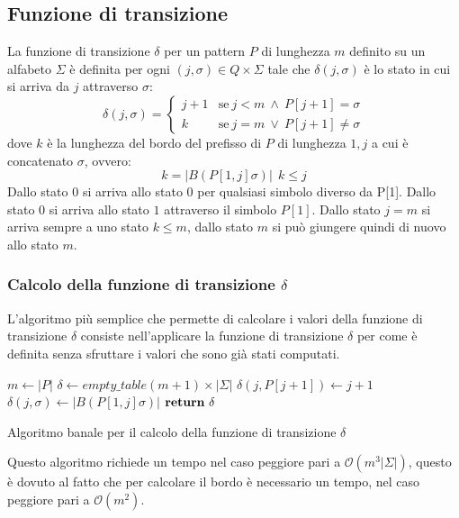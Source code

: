 \subsection{Funzione di transizione}
La funzione di transizione $\delta$ per un pattern $P$ di lunghezza $m$ definito
su un alfabeto $\Sigma$ è definita per ogni $(j, \sigma) \in Q \times \Sigma$ tale
che $\delta(j, \sigma)$ è lo stato in cui si arriva da $j$ attraverso $\sigma$:
\begin{equation}
    \delta(j, \sigma) = \begin{cases}
        j + 1 & \text{se} \ j < m \ \land \ P[j + 1] = \sigma   \\
        k     & \text{se} \ j = m \ \lor \ P[j + 1] \neq \sigma
    \end{cases}
\end{equation}
dove $k$ è la lunghezza del bordo del prefisso di $P$ di lunghezza $1, j$ a cui
è concatenato $\sigma$, ovvero:
\begin{equation}
    k = |B(P[1, j]\sigma)| \ \ k \leq j
\end{equation}
Dallo stato $0$ si arriva allo stato $0$ per qualsiasi simbolo diverso da P[1].
Dallo stato $0$ si arriva allo stato $1$ attraverso il simbolo $P[1]$. Dallo stato
$j = m$ si arriva sempre a uno stato $k \leq m$, dallo stato $m$ si può giungere
quindi di nuovo allo stato $m$.
\subsubsection{Calcolo della funzione di transizione $\delta$}
L'algoritmo più semplice che permette di calcolare i valori della funzione di
transizione $\delta$ consiste nell'applicare la funzione di transizione $\delta$
per come è definita senza sfruttare i valori che sono già stati computati.
\begin{algorithm}
    \begin{algorithmic}
        \State $m\gets |P|$
        \State $\delta \gets empty\_table (m + 1) \times | \Sigma|$
        \State $\delta(j, P[j + 1]) \gets j + 1$
        \EndFor
        \For{$\sigma \in \Sigma$}
        \State $\delta(j, \sigma) \gets |B(P[1, j]\sigma)|$
        \EndFor
        \EndFor
        \State $\text{\textbf{return}} \ \delta$
        \EndFunction
    \end{algorithmic}
    \caption{Algoritmo banale per il calcolo della funzione di transizione $\delta$}
\end{algorithm}
Questo algoritmo richiede un tempo nel caso peggiore pari a $\mathcal{O}(m^3 | \Sigma|)$,
questo è dovuto al fatto che per calcolare il bordo è necessario un tempo, nel
caso peggiore pari a $\mathcal{O}(m^2)$.

